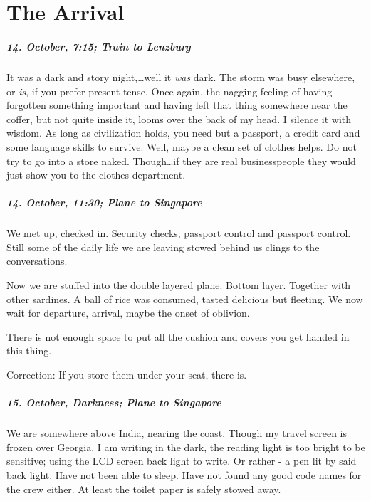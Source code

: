 \chapter{The Arrival}


\paragraph{14. October, 7:15; Train to Lenzburg}
It was a dark and story night,\ldots well it \emph{was} dark.
The storm was busy elsewhere, or \emph{is}, if you prefer present tense.
Once again, the nagging feeling of having forgotten something important and having left that thing somewhere near the coffer, but not quite inside it, looms over the back of my head.
I silence it with wisdom.
As long as civilization holds, you need but a passport, a credit card and some language skills to survive.
Well, maybe a clean set of clothes helps.
Do not try to go into a store naked.
Though\ldots if they are real businesspeople they would just show you to the clothes department.

\paragraph{14. October, 11:30; Plane to Singapore}
We met up, checked in.
Security checks, passport control and passport control.
Still some of the daily life we are leaving stowed behind us clings to the conversations.

Now we are stuffed into the double layered plane.
Bottom layer.
Together with other sardines.
A ball of rice was consumed, tasted delicious but fleeting.
We now wait for departure, arrival, maybe the onset of oblivion.

There is not enough space to put all the cushion and covers you get handed in this thing.

Correction: If you store them under your seat, there is.

\paragraph{15. October, Darkness; Plane to Singapore}
We are somewhere above India, nearing the coast.
Though my travel screen is frozen over Georgia.
I am writing in the dark, the reading light is too bright to be sensitive; using the LCD screen back light to write.
Or rather - a pen lit by said back light.
Have not been able to sleep.
Have not found any good code names for the crew either.
At least the toilet paper is safely stowed away.

